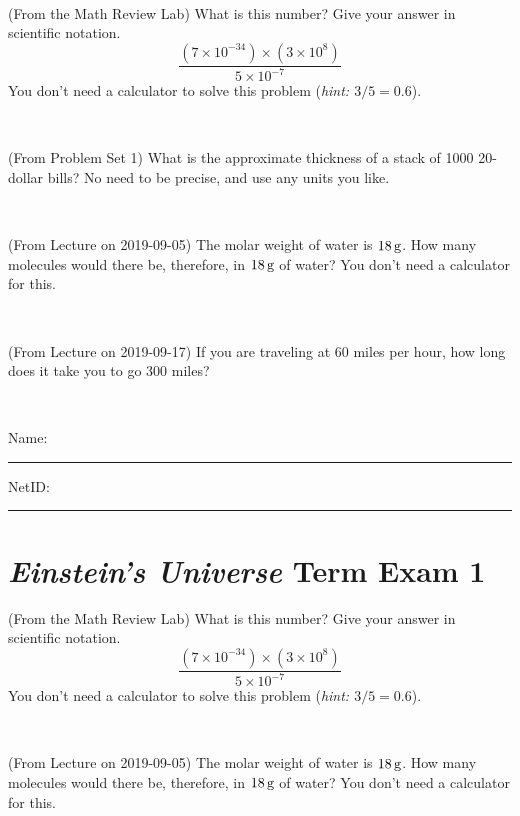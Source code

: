 \documentclass[12pt, letterpaper]{article}
\begin{document}
\vfill ~


\clearpage


\begin{problem} (From the Math Review Lab)
What is this number? Give your answer in scientific notation.
$$
\frac{(7\times10^{-34})\times(3\times10^8)}{5\times10^{-7}}
$$
You don't need a calculator to solve this problem (\textit{hint: $3/5=0.6$}).
\end{problem}


\vfill ~

\begin{problem} (From Problem Set 1)
What is the approximate thickness of a stack of 1000 20-dollar bills?
No need to be precise, and use any units you like.
\end{problem}


\vfill ~

\begin{problem} (From Lecture on 2019-09-05)
The molar weight of water is $18\,\mathrm{g}$. How many molecules would there
be, therefore, in $18\,\mathrm{g}$ of water? You don't need a calculator for
this.
\end{problem}


\vfill ~

\begin{problem} (From Lecture on 2019-09-17)
If you are traveling at 60 miles per hour, how long does
it take you to go 300 miles?
\end{problem}


\vfill ~


\cleardoublepage



\noindent
Name: \rule[-1ex]{0.60\textwidth}{0.1pt}
NetID: \rule[-1ex]{0.20\textwidth}{0.1pt}

\section*{\textsl{Einstein's Universe} Term Exam 1}
\setcounter{problem}{1}


\begin{problem} (From the Math Review Lab)
What is this number? Give your answer in scientific notation.
$$
\frac{(7\times10^{-34})\times(3\times10^8)}{5\times10^{-7}}
$$
You don't need a calculator to solve this problem (\textit{hint: $3/5=0.6$}).
\end{problem}


\vfill ~

\begin{problem} (From Lecture on 2019-09-05)
The molar weight of water is $18\,\mathrm{g}$. How many molecules would there
be, therefore, in $18\,\mathrm{g}$ of water? You don't need a calculator for
this.
\end{problem}
\end{document}
